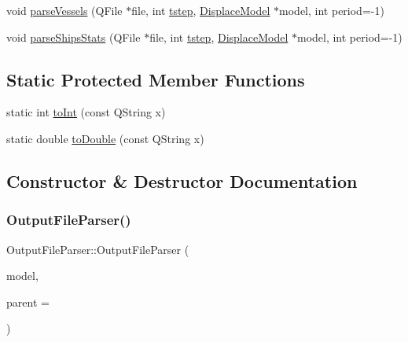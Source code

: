 \begin{DoxyCompactItemize}
\item 
void \mbox{\hyperlink{class_output_file_parser_a0668618d96d296eaae78772940a1dad0}{parse\+Vessels}} (Q\+File $\ast$file, int \mbox{\hyperlink{thread__vessels_8cpp_a84bc73d278de929ec9974e1a95d9b23a}{tstep}}, \mbox{\hyperlink{class_displace_model}{Displace\+Model}} $\ast$model, int period=-\/1)
\item 
void \mbox{\hyperlink{class_output_file_parser_a42c598b45a065fa4059d104f32e1833b}{parse\+Ships\+Stats}} (Q\+File $\ast$file, int \mbox{\hyperlink{thread__vessels_8cpp_a84bc73d278de929ec9974e1a95d9b23a}{tstep}}, \mbox{\hyperlink{class_displace_model}{Displace\+Model}} $\ast$model, int period=-\/1)
\end{DoxyCompactItemize}
\subsection*{Static Protected Member Functions}
\begin{DoxyCompactItemize}
\item 
static int \mbox{\hyperlink{class_output_file_parser_ab6ef94de181f17f5dec84cac176680cc}{to\+Int}} (const Q\+String x)
\item 
static double \mbox{\hyperlink{class_output_file_parser_a87f5cbf9b33862b42819535f3d21d04c}{to\+Double}} (const Q\+String x)
\end{DoxyCompactItemize}


\subsection{Constructor \& Destructor Documentation}
\mbox{\label{class_output_file_parser_a9ed11e913211e4cc4d715127b79a7458}} 
\subsubsection{\texorpdfstring{OutputFileParser()}{OutputFileParser()}}
{\footnotesize\ttfamily Output\+File\+Parser\+::\+Output\+File\+Parser (\begin{DoxyParamCaption}\item[{\mbox{\hyperlink{class_displace_model}{Displace\+Model}} $\ast$}]{model,  }\item[{Q\+Object $\ast$}]{parent = {} }\end{DoxyParamCaption})\hspace{0.3cm}{\ttfamily [explicit]}}



